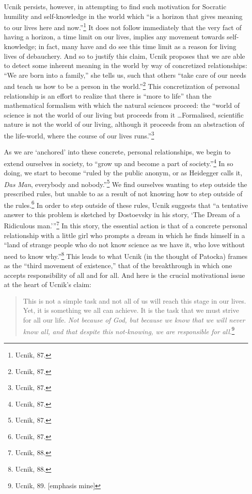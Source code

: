 \documentclass[12pt]{article}
\begin{document}
	Ucnik persists, however, in attempting to find such motivation for Socratic humility and self-knowledge in the world which ``is a horizon that gives meaning to our lives here and now.''\footnote{Ucnik, 87.} It does not follow immediately that the very fact of having a horizon, a time limit on our lives, implies any movement towards self-knowledge; in fact, many have and do see this time limit as a reason for living lives of debauchery. And so to justify this claim, Ucnik proposes that we are able to detect some inherent meaning in the world by way of concretized relationships: ``We are born into a family,'' she tells us, such that others ``take care of our needs and teach us how to be a person in the world.''\footnote{Ucnik, 87.} This concretization of personal relationship is an effort to realize that there is ``more to life'' than the mathematical formalism with which the natural sciences proceed: the ``world of science is not the world of our living but proceeds from it \ldots Formalised, scientific nature is not the world of our living, although it proceeds from an abstraction of the life-world, where the course of our lives runs.''\footnote{Ucnik, 87.}
	
	As we are `anchored' into these concrete, personal relationships, we begin to extend ourselves in society, to ``grow up and become a part of society.''\footnote{Ucnik, 87.} In so doing, we start to become ``ruled by the public anonym, or as Heidegger calls it, \emph{Das Man}, everybody and nobody.''\footnote{Ucnik, 87.} We find ourselves wanting to step outside the prescribed rules, but unable to as a result of not knowing how to step outside of the rules.\footnote{Ucnik, 87.} In order to step outside of these rules, Ucnik suggests that ``a tentative answer to this problem is sketched by Dostoevsky in his story, `The Dream of a Ridiculous man.'\thinspace''\footnote{Ucnik, 88.} In this story, the essential action is that of a concrete personal relationship with a little girl who prompts a dream in which he finds himself in a ``land of strange people who do not know science as we have it, who love without need to know why.''\footnote{Ucnik, 88.} This leads to what Ucnik (in the thought of Patocka) frames as the ``third movement of existence,'' that of the breakthrough in which one accepts responsibility of all and for all. And here is the crucial motivational issue at the heart of Ucnik's claim: 
	
	\begin{quote}
	\singlespacing
	\footnotesize
	
	This is not a simple task and not all of us will reach this stage in our lives. Yet, it is something we all can achieve. It is the task that we must strive for all our life. \emph{Not because of God, but because we know that we will never know all, and that despite this not-knowing, we are responsible for all.}\footnote{Ucnik, 89. [emphasis mine]}
	
	\end{quote}
\end{document}
